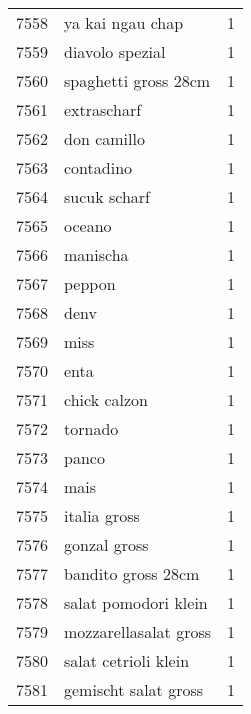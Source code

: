 \begin{tabular}{llr}
7558 &                                   ya kai ngau chap &      1 \\
7559 &                                    diavolo spezial &      1 \\
7560 &                               spaghetti gross 28cm &      1 \\
7561 &                                        extrascharf &      1 \\
7562 &                                        don camillo &      1 \\
7563 &                                          contadino &      1 \\
7564 &                                       sucuk scharf &      1 \\
7565 &                                             oceano &      1 \\
7566 &                                           manischa &      1 \\
7567 &                                             peppon &      1 \\
7568 &                                               denv &      1 \\
7569 &                                               miss &      1 \\
7570 &                                               enta &      1 \\
7571 &                                       chick calzon &      1 \\
7572 &                                            tornado &      1 \\
7573 &                                              panco &      1 \\
7574 &                                               mais &      1 \\
7575 &                                       italia gross &      1 \\
7576 &                                       gonzal gross &      1 \\
7577 &                                 bandito gross 28cm &      1 \\
7578 &                               salat pomodori klein &      1 \\
7579 &                              mozzarellasalat gross &      1 \\
7580 &                               salat cetrioli klein &      1 \\
7581 &                               gemischt salat gross &      1 \\

\end{tabular}
